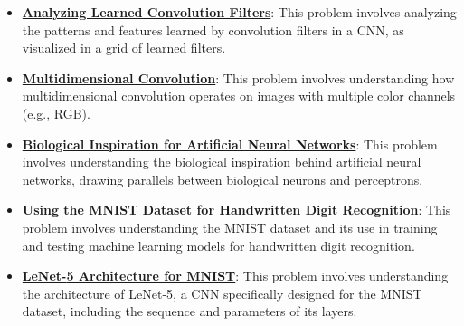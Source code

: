 \documentclass{article}%
\begin{document}
\begin{itemize}[leftmargin=*]
\item \href{https://purdue.brightspace.com/d2l/common/assets/pdfjs-d2l-dist/1.0.14-legacy/web/viewer.html?file=\%2Fcontent\%2Fenforced\%2F1095467-wl.202510.CS.24300.001\%2F09L1-cnn.pdf\%3Fou\%3D1095467\&lang=en-us\&container=d2l-fileviewer-rendered-pdf\&fullscreen=d2l-fileviewer-rendered-pdf-dialog\&height=667#page=18}{\textbf{Analyzing Learned Convolution Filters}}: This problem involves analyzing the patterns and features learned by convolution filters in a CNN, as visualized in a grid of learned filters.%
\item \href{https://purdue.brightspace.com/d2l/common/assets/pdfjs-d2l-dist/1.0.14-legacy/web/viewer.html?file=\%2Fcontent\%2Fenforced\%2F1095467-wl.202510.CS.24300.001\%2F09L1-cnn.pdf\%3Fou\%3D1095467\&lang=en-us\&container=d2l-fileviewer-rendered-pdf\&fullscreen=d2l-fileviewer-rendered-pdf-dialog\&height=667#page=19}{\textbf{Multidimensional Convolution}}: This problem involves understanding how multidimensional convolution operates on images with multiple color channels (e.g., RGB).%
\item \href{https://purdue.brightspace.com/d2l/common/assets/pdfjs-d2l-dist/1.0.14-legacy/web/viewer.html?file=\%2Fcontent\%2Fenforced\%2F1095467-wl.202510.CS.24300.001\%2F09L1-cnn.pdf\%3Fou\%3D1095467\&lang=en-us\&container=d2l-fileviewer-rendered-pdf\&fullscreen=d2l-fileviewer-rendered-pdf-dialog\&height=667#page=20}{\textbf{Biological Inspiration for Artificial Neural Networks}}: This problem involves understanding the biological inspiration behind artificial neural networks, drawing parallels between biological neurons and perceptrons.%
\item \href{https://purdue.brightspace.com/d2l/common/assets/pdfjs-d2l-dist/1.0.14-legacy/web/viewer.html?file=\%2Fcontent\%2Fenforced\%2F1095467-wl.202510.CS.24300.001\%2F09L1-cnn.pdf\%3Fou\%3D1095467\&lang=en-us\&container=d2l-fileviewer-rendered-pdf\&fullscreen=d2l-fileviewer-rendered-pdf-dialog\&height=667#page=21}{\textbf{Using the MNIST Dataset for Handwritten Digit Recognition}}: This problem involves understanding the MNIST dataset and its use in training and testing machine learning models for handwritten digit recognition.%
\item \href{https://purdue.brightspace.com/d2l/common/assets/pdfjs-d2l-dist/1.0.14-legacy/web/viewer.html?file=\%2Fcontent\%2Fenforced\%2F1095467-wl.202510.CS.24300.001\%2F09L1-cnn.pdf\%3Fou\%3D1095467\&lang=en-us\&container=d2l-fileviewer-rendered-pdf\&fullscreen=d2l-fileviewer-rendered-pdf-dialog\&height=667#page=22}{\textbf{LeNet{-}5 Architecture for MNIST}}: This problem involves understanding the architecture of LeNet-5, a CNN specifically designed for the MNIST dataset, including the sequence and parameters of its layers.%

\end{itemize}
\end{document}
